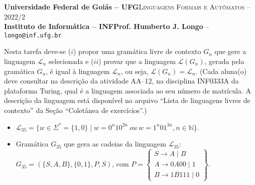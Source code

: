 \documentclass[12pt]{article}
\def\discente{João Lucas Rodrigues Soares}
\def\matricula{202003580}
\def\ua{12}
\def\myling{{35}} %
\begin{document}
 \begin{tcolorbox}[rounded corners, colback=blue!3, colframe=blue!40!black]
  \footnotesize\textbf{Universidade Federal de Goiás -- UFG}\hfill \textsc{Linguagens Formais e Autômatos -- 2022/2}\\
  \footnotesize\textbf{Instituto de Informática -- INF\hfill Prof. Humberto J. Longo} -- \scriptsize\texttt{longo@inf.ufg.br}
 \end{tcolorbox}\bigskip
%
\begin{tcolorbox}[rounded corners, colback=blue!2, colframe=blue!40!black, title=\textbf{Atividade AA-\ua}]
  Nesta tarefa deve-se ($i$) propor uma gramática livre de contexto $G_n$ que gere a linguagem $\mathcal{L}_n$ selecionada e ($ii$) provar que a linguagem $\mathcal{L}(G_n)$, gerada pela gramática $G_n$, é igual à linguagem $\mathcal{L}_n$, ou seja, $\mathcal{L}(G_n)=\mathcal{L}_n$. (Cada aluna(o) deve consultar na descrição da atividade AA--\ua, na disciplina INF0333A da plataforma Turing, qual é a linguagem associada ao seu número de matrícula. A descrição da linguagem está disponível no arquivo ``Lista de linguagens livres de contexto'' da Seção ``Coletânea de exercícios''.)
\end{tcolorbox}\bigskip

%
\begin{tcolorbox}[rounded corners, colback=yellow!5, colframe=red!40!black, title={\discente\ (\matricula)}]
\begin{itemize}
  \item $\mathcal{L}_{\myling} =  \{w \in \Sigma^* = \{1,0\} \mid w = 0^n10^{2n}\  ou\ w = 1^n01^{3n}, n \in \mathbb{N}\}$.
  \item Gramática $G_{\myling}$ que gera as cadeias da linguagem $\mathcal{L}_{\myling}$:\\
  
  $G_{\myling}=(\{S,A,B\},\{0,1\},P,S)$, com
  $
   P =
   \left\{\begin{array}{l}
    S\to A\mid B\\
    A\to 0A00\mid 1\\
    B\to 1B111\mid 0
   \end{array}\right\}.
  $
 \end{itemize}
\end{tcolorbox}\bigskip
\end{document}
